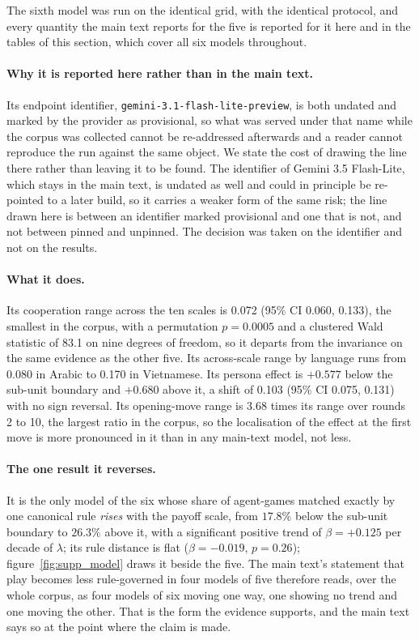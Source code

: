 \documentclass[11pt,a4paper]{article}
\newcommand{\lam}{\lambda}
\newcommand{\ci}[2]{(95\% CI #1, #2)}
\begin{document}
The sixth model was run on the identical grid, with the identical protocol, and every quantity the main text reports for the five is reported for it here and in the tables of this section, which cover all six models throughout.

\paragraph{Why it is reported here rather than in the main text.} Its endpoint
identifier, \texttt{gemini-3.1-\allowbreak flash-lite-\allowbreak preview}, is both undated and marked by the provider as provisional, so what was served under that name while the corpus was collected cannot be re-addressed afterwards and a reader cannot reproduce the run against the same object. We state the cost of drawing the line there rather than leaving it to be found. The identifier of Gemini 3.5 Flash-Lite, which stays in the main text, is undated as well and could in principle be re-pointed to a later build, so it carries a weaker form of the same risk; the line drawn here is between an identifier marked provisional and one that is not, and not between pinned and unpinned. The decision was taken on the identifier and not on the results.

\paragraph{What it does.} Its cooperation range across the ten scales is 0.072
\ci{0.060}{0.133}, the smallest in the corpus, with a permutation $p = 0.0005$ and a clustered Wald statistic of 83.1 on nine degrees of freedom, so it departs from the invariance on the same evidence as the other five. Its across-scale range by language runs from 0.080 in Arabic to 0.170 in Vietnamese. Its persona effect is $+0.577$ below the sub-unit boundary and $+0.680$ above it, a shift of 0.103 \ci{0.075}{0.131} with no sign reversal. Its opening-move range is 3.68 times its range over rounds 2 to 10, the largest ratio in the corpus, so the localisation of the effect at the first move is more pronounced in it than in any main-text model, not less.

\paragraph{The one result it reverses.} It is the only model of the six whose
share of agent-games matched exactly by one canonical rule \emph{rises} with the payoff scale, from $17.8\%$ below the sub-unit boundary to $26.3\%$ above it, with a significant positive trend of $\beta = +0.125$ per decade of $\lam$; its rule distance is flat ($\beta = -0.019$, $p = 0.26$); figure~\ref{fig:supp_model} draws it beside the five. The main text's statement that play becomes less rule-governed in four models of five therefore reads, over the whole corpus, as four models of six moving one way, one showing no trend and one moving the other. That is the form the evidence supports, and the main text says so at the point where the claim is made.
\end{document}
